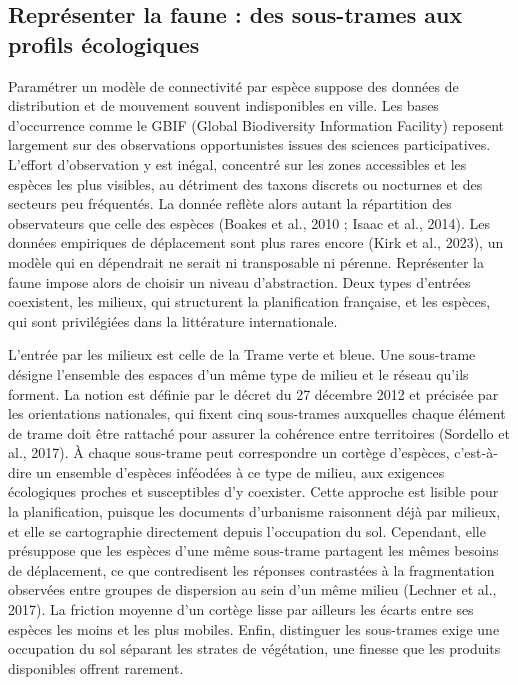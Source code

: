 \documentclass[a4paper,12pt]{report}
\begin{document}
\subsection{Représenter la faune : des sous-trames aux profils écologiques}
Paramétrer un modèle de connectivité par espèce suppose des données de distribution et de mouvement souvent indisponibles en ville. Les bases d'occurrence comme le GBIF (Global Biodiversity Information Facility) reposent largement sur des observations opportunistes issues des sciences participatives. L'effort d'observation y est inégal, concentré sur les zones accessibles et les espèces les plus visibles, au détriment des taxons discrets ou nocturnes et des secteurs peu fréquentés. La donnée reflète alors autant la répartition des observateurs que celle des espèces (Boakes et al., 2010 ; Isaac et al., 2014). Les données empiriques de déplacement sont plus rares encore (Kirk et al., 2023), un modèle qui en dépendrait ne serait ni transposable ni pérenne. Représenter la faune impose alors de choisir un niveau d'abstraction. Deux types d'entrées coexistent, les milieux, qui structurent la planification française, et les espèces, qui sont privilégiées dans la littérature internationale.

L'entrée par les milieux est celle de la Trame verte et bleue. Une sous-trame désigne l'ensemble des espaces d'un même type de milieu et le réseau qu'ils forment. La notion est définie par le décret du 27 décembre 2012 et précisée par les orientations nationales, qui fixent cinq sous-trames auxquelles chaque élément de trame doit être rattaché pour assurer la cohérence entre territoires (Sordello et al., 2017). À chaque sous-trame peut correspondre un cortège d'espèces, c'est-à-dire un ensemble d'espèces inféodées à ce type de milieu, aux exigences écologiques proches et susceptibles d'y coexister. Cette approche est lisible pour la planification, puisque les documents d'urbanisme raisonnent déjà par milieux, et elle se cartographie directement depuis l'occupation du sol. Cependant, elle présuppose que les espèces d'une même sous-trame partagent les mêmes besoins de déplacement, ce que contredisent les réponses contrastées à la fragmentation observées entre groupes de dispersion au sein d'un même milieu (Lechner et al., 2017). La friction moyenne d'un cortège lisse par ailleurs les écarts entre ses espèces les moins et les plus mobiles. Enfin, distinguer les sous-trames exige une occupation du sol séparant les strates de végétation, une finesse que les produits disponibles offrent rarement.
\end{document}
